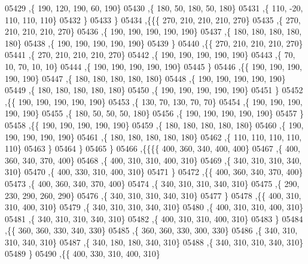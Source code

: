 \begin{DoxyCode}
05429     ,\{   190,   120,   190,    60,   190\}
05430     ,\{   180,    50,   180,    50,   180\}
05431     ,\{   110,   -20,   110,   110,   110\}
05432     \}
05433    \}
05434   ,\{\{\{   270,   210,   210,   210,   270\}
05435     ,\{   270,   210,   210,   210,   270\}
05436     ,\{   190,   190,   190,   190,   190\}
05437     ,\{   180,   180,   180,   180,   180\}
05438     ,\{   190,   190,   190,   190,   190\}
05439     \}
05440    ,\{\{   270,   210,   210,   210,   270\}
05441     ,\{   270,   210,   210,   210,   270\}
05442     ,\{   190,   190,   190,   190,   190\}
05443     ,\{    70,    10,    70,    10,    10\}
05444     ,\{   190,   190,   190,   190,   190\}
05445     \}
05446    ,\{\{   190,   190,   190,   190,   190\}
05447     ,\{   180,   180,   180,   180,   180\}
05448     ,\{   190,   190,   190,   190,   190\}
05449     ,\{   180,   180,   180,   180,   180\}
05450     ,\{   190,   190,   190,   190,   190\}
05451     \}
05452    ,\{\{   190,   190,   190,   190,   190\}
05453     ,\{   130,    70,   130,    70,    70\}
05454     ,\{   190,   190,   190,   190,   190\}
05455     ,\{   180,    50,    50,    50,   180\}
05456     ,\{   190,   190,   190,   190,   190\}
05457     \}
05458    ,\{\{   190,   190,   190,   190,   190\}
05459     ,\{   180,   180,   180,   180,   180\}
05460     ,\{   190,   190,   190,   190,   190\}
05461     ,\{   180,   180,   180,   180,   180\}
05462     ,\{   110,   110,   110,   110,   110\}
05463     \}
05464    \}
05465   \}
05466  ,\{\{\{\{   400,   360,   340,   400,   400\}
05467     ,\{   400,   360,   340,   370,   400\}
05468     ,\{   400,   310,   310,   400,   310\}
05469     ,\{   340,   310,   310,   340,   310\}
05470     ,\{   400,   330,   310,   400,   310\}
05471     \}
05472    ,\{\{   400,   360,   340,   370,   400\}
05473     ,\{   400,   360,   340,   370,   400\}
05474     ,\{   340,   310,   310,   340,   310\}
05475     ,\{   290,   230,   290,   260,   290\}
05476     ,\{   340,   310,   310,   340,   310\}
05477     \}
05478    ,\{\{   400,   310,   310,   400,   310\}
05479     ,\{   340,   310,   310,   340,   310\}
05480     ,\{   400,   310,   310,   400,   310\}
05481     ,\{   340,   310,   310,   340,   310\}
05482     ,\{   400,   310,   310,   400,   310\}
05483     \}
05484    ,\{\{   360,   360,   330,   340,   330\}
05485     ,\{   360,   360,   330,   300,   330\}
05486     ,\{   340,   310,   310,   340,   310\}
05487     ,\{   340,   180,   180,   340,   310\}
05488     ,\{   340,   310,   310,   340,   310\}
05489     \}
05490    ,\{\{   400,   330,   310,   400,   310\}

\end{DoxyCode}
